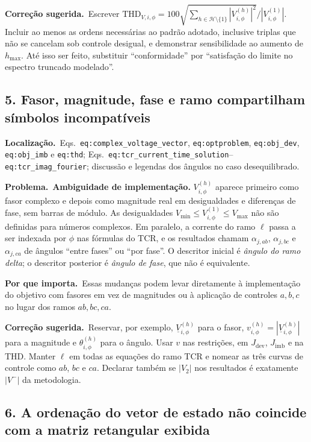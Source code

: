 \documentclass[11pt,a4paper]{article}
\newcommand{\localizacao}{\textbf{Localização.}\ }
\newcommand{\problema}{\textbf{Problema.}\ }
\newcommand{\impacto}{\textbf{Por que importa.}\ }
\newcommand{\correcao}{\textbf{Correção sugerida.}\ }
\begin{document}
\correcao Escrever
$\mathrm{THD}_{V,i,\phi}=100
\sqrt{\sum_{h\in\mathcal H\setminus\{1\}}|V_{i,\phi}^{(h)}|^2}/
|V_{i,\phi}^{(1)}|$. Incluir ao menos as ordens necessárias ao padrão adotado,
inclusive triplas que não se cancelam sob controle desigual, e demonstrar
sensibilidade ao aumento de $h_{\max}$. Até isso ser feito, substituir
``conformidade'' por ``satisfação do limite no espectro truncado modelado''.

\subsection*{5. Fasor, magnitude, fase e ramo compartilham símbolos incompatíveis}

\localizacao Eqs.~\texttt{eq:complex\_voltage\_vector},
\texttt{eq:optproblem}, \texttt{eq:obj\_dev}, \texttt{eq:obj\_imb} e
\texttt{eq:thd}; Eqs.~\texttt{eq:tcr\_current\_time\_solution}--
\texttt{eq:tcr\_imag\_fourier}; discussão e legendas dos ângulos no caso
desequilibrado.

\problema \textbf{Ambiguidade de implementação.} $V_{i,\phi}^{(h)}$ aparece
primeiro como fasor complexo e depois como magnitude real em desigualdades e
diferenças de fase, sem barras de módulo. As desigualdades
$V_{\min}\le V_{i,\phi}^{(1)}\le V_{\max}$ não são definidas para números
complexos. Em paralelo, a corrente do ramo $\ell$ passa a ser indexada por
$\phi$ nas fórmulas do TCR, e os resultados chamam $\alpha_{j,ab}$,
$\alpha_{j,bc}$ e $\alpha_{j,ca}$ de ângulos ``entre fases'' ou ``por fase''.
O descritor inicial é \emph{ângulo do ramo delta}; o descritor posterior é
\emph{ângulo de fase}, que não é equivalente.

\impacto Essas mudanças podem levar diretamente à implementação do objetivo
com fasores em vez de magnitudes ou à aplicação de controles $a,b,c$ no lugar
dos ramos $ab,bc,ca$.

\correcao Reservar, por exemplo, $\underline V_{i,\phi}^{(h)}$ para o fasor,
$v_{i,\phi}^{(h)}=|\underline V_{i,\phi}^{(h)}|$ para a magnitude e
$\theta_{i,\phi}^{(h)}$ para o ângulo. Usar $v$ nas restrições, em
$J_{\mathrm{dev}}$, $J_{\mathrm{imb}}$ e na THD. Manter $\ell$ em todas as
equações do ramo TCR e nomear as três curvas de controle como $ab$, $bc$ e
$ca$. Declarar também se $|V_2|$ nos resultados é exatamente $|V^-|$ da
metodologia.

\subsection*{6. A ordenação do vetor de estado não coincide com a matriz retangular exibida}
\end{document}
